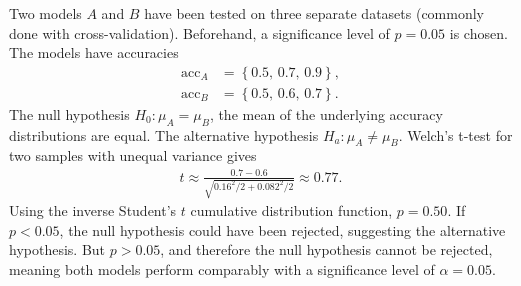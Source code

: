 \begin{example}
    Two models $A$ and $B$ have been tested on three separate datasets (commonly done with cross-validation).
    Beforehand, a significance level of $p = 0.05$ is chosen.
    The models have accuracies
    \begin{align}
        \text{acc}_A &= \left\{0.5,\, 0.7,\, 0.9\right\}, \\
        \text{acc}_B &= \left\{0.5,\, 0.6,\, 0.7\right\}.
    \end{align}
    The null hypothesis $H_0 : \mu_A = \mu_B$, \ie the mean of the underlying accuracy distributions are equal.
    The alternative hypothesis $H_a : \mu_A \neq \mu_B$.
    Welch's t-test for two samples with unequal variance gives
    \begin{align}
        t \approx \frac{0.7 - 0.6}{\sqrt{0.16^2 / 2 + 0.082^2 / 2}} \approx 0.77.
    \end{align}
    Using the inverse Student's $t$ cumulative distribution function, $p = 0.50$.
    If $p < 0.05$, the null hypothesis could have been rejected, suggesting the alternative hypothesis.
    But $p > 0.05$, and therefore the null hypothesis cannot be rejected, meaning both models perform comparably with a significance level of $\alpha = 0.05$.
\end{example}
